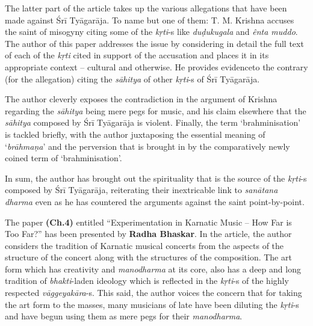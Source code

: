 The latter part of the article takes up the various allegations that have been made against Śrī Tyāgarāja. To name but one of them: T. M. Krishna accuses the saint of misogyny citing some of the \textit{kṛti}-s like \textit{duḍukugala} and \textit{ênta muddo}. The author of this paper addresses the issue by considering in detail the full text of each of the \textit{kṛti} cited in support of the accusation and places it in its appropriate context – cultural and otherwise. He provides evidence\break to the contrary (for the allegation) citing the \textit{sāhitya} of other \textit{kṛti}-s of Śrī Tyāgarāja.

The author cleverly exposes the contradiction in the argument of Krishna regarding the \textit{sāhitya} being mere pegs for music, and his claim elsewhere that the \textit{sāhitya} composed by Śrī Tyāgarāja is violent. Finally, the term ‘brahminisation’ is tackled briefly, with the author juxtaposing the essential meaning of ‘\textit{brāhmaṇa}’ and the perversion that is brought in by the comparatively newly coined term of ‘brahminisation’.

In sum, the author has brought out the spirituality that is the source of the \textit{kṛti}-s composed by Śrī Tyāgarāja, reiterating their inextricable link to \textit{sanātana dharma} even as he has countered the arguments against the saint point-by-point.

The paper \textbf{(Ch.4)} entitled “Experimentation in Karnatic Music – How Far is Too Far?” has been presented by \textbf{Radha Bhaskar}. In the article, the author considers the tradition of Karnatic musical concerts from the aspects of the structure of the concert along with the structures of the composition. The art form which has creativity and \textit{manodharma} at its core, also has a deep and long tradition of \textit{bhakti}-laden ideology which is reflected in the \textit{kṛti}-s of the highly respected \textit{vāggeyakāra}-s. This said, the author voices the concern that for taking the art form to the masses, many musicians of late have been diluting the \textit{kṛti}-s and have begun using them as mere pegs for their \textit{manodharma}.

